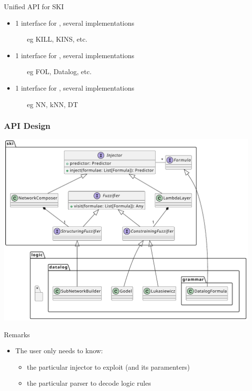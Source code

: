 \documentclass[presentation]{beamer}\mode<presentation>{\usetheme{AMSBolognaFC}}
\begin{document}
\begin{frame}[allowframebreaks]
    \begin{block}{Unified API for SKI}
        \begin{itemize}
            \item 1 interface for , several implementations
            \begin{itemize}
                \item[eg] KILL, KINS, etc.
            \end{itemize}
            \item 1 interface for , several implementations
            \begin{itemize}
                \item[eg] FOL, Datalog, etc.
            \end{itemize}
            \item 1 interface for , several implementations
            \begin{itemize}
                \item[eg] NN, kNN, DT
            \end{itemize}
        \end{itemize}
    \end{block}
\end{frame}

\begin{frame}[allowframebreaks]
\frametitle{API Design}

    \begin{center}
        \includegraphics[width=.7\linewidth]{figures/psyki-class-diagram.pdf}
    \end{center}

    \framebreak

    \begin{alertblock}{Remarks}
        \begin{itemize}
            \item The user only needs to know:
            \begin{itemize}
                \item the particular injector to exploit (and its paramenters)
                \item the particular parser to decode logic rules
            \end{itemize}
        \end{itemize}
    \end{alertblock}
\end{frame}
\end{document}
